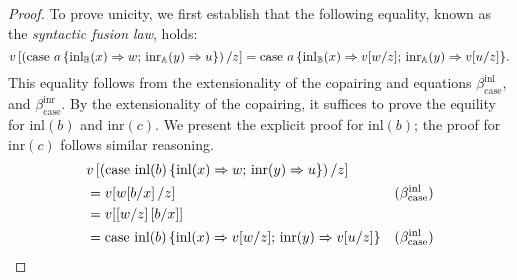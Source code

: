 \begin{proof}
  To prove unicity, we first establish that the following equality, known  as the \emph{syntactic fusion law}, holds:
  \begin{equation*}
   v \left[ \left(\text{case } a \,\{\mathrm{inl}_{\mathbb{B}}(x) \Rightarrow w ; \, \mathrm{inr}_{\mathbb{A}}(y) \Rightarrow u\}\right)  / z \right]  =  \text{case } a \,\{\mathrm{inl}_{\mathbb{B}}(x) \Rightarrow v[w/z] ; \, \mathrm{inr}_{\mathbb{A}}(y) \Rightarrow v[u/z]\}.
  \end{equation*}
This equality follows from the extensionality of the copairing and equations  $\beta_{\text{case}}^{\text{inl}}$, and $\beta_{\text{case}}^{\text{inr}}$. 
By the extensionality of the copairing, it suffices to prove the equility for  $\text{inl}(b)$ and $\text{inr}(c)$.
We present the explicit proof for $\text{inl}(b)$; the proof for  $\text{inr}(c)$ follows similar reasoning.
\begin{equation*}
\begin{split}
  & v \left[ \left(\text{case } \text{inl}(b) \,\{\mathrm{inl}(x) \Rightarrow w ; \, \mathrm{inr}(y) \Rightarrow u\}\right)  / z \right] & \\
  & =  v [w[b/x]\,/z] & (\beta_{\text{case}}^{\text{inl}})\\
  & =   v [[w/z]\,[b/x]]    \\
   & =  \text{case } \text{inl}(b) \,\{\mathrm{inl}(x) \Rightarrow v[w/z] ; \, \mathrm{inr}(y) \Rightarrow v[u/z]\}   & (\beta_{\text{case}}^{\text{inl}})
\end{split}
\end{equation*}


\end{proof}
